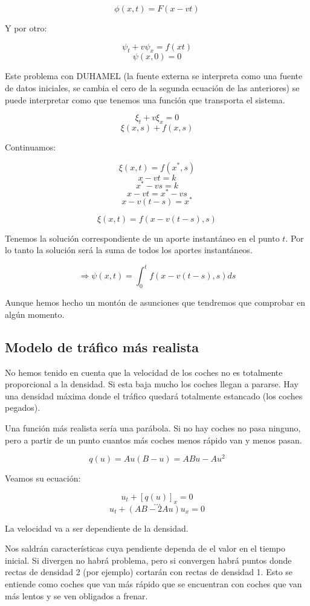 \documentclass[palatino]{apuntes}
\begin{document}
$$\phi(x,t) = F(x-vt)$$

Y por otro:

$$\psi_t + v\psi_x = f(xt)$$
$$\psi(x,0) = 0$$

Este problema con DUHAMEL (la fuente externa se interpreta como una fuente de datos iniciales, se cambia el cero de la segunda ecuación de las anteriores) se puede interpretar como que tenemos una función que transporta el sistema.

$$\xi_t + v\xi_x = 0$$
$$\xi(x,s) + f(x,s)$$

Continuamos:

$$\xi(x,t) = f(x^*,s)$$
$$x-vt = k$$
$$x^* - vs = k$$
$$x-vt = x^* - vs$$
$$x-v(t-s) = x^{*}$$

$$\xi(x,t) = f(x - v(t-s), s)$$


Tenemos la solución correspondiente de un aporte instantáneo en el punto $t$. Por lo tanto la solución será la suma de todos los aportes instantáneos.

$$\Rightarrow \psi(x,t) = \int^{t}_{0} f(x-v(t-s),s) ds $$

Aunque hemos hecho un montón de asunciones que tendremos que comprobar en algún momento.

\subsection{Modelo de tráfico más realista}

No hemos tenido en cuenta que la velocidad de los coches no es totalmente proporcional a la densidad. Si esta baja mucho los coches llegan a pararse. Hay una densidad máxima donde el tráfico quedará totalmente estancado (los coches pegados).

Una función más realista sería una parábola. Si no hay coches no pasa ninguno, pero a partir de un punto cuantos más coches menos rápido van y menos pasan.

$$ q(u) = Au (B-u) = ABu - Au^{2} $$

Veamos su ecuación:

$$u_t + [q(u)]_x = 0$$
$$ … $$
$$ u_t + (AB - 2Au) u_x = 0 $$

La velocidad va a ser dependiente de la densidad.

Nos saldrán características cuya pendiente dependa de el valor en el tiempo inicial. Si divergen no habrá problema, pero si convergen habrá puntos donde rectas de densidad 2 (por ejemplo) cortarán con rectas de densidad 1. Esto se entiende como coches que van más rápido que se encuentran con coches que van más lentos y se ven obligados a frenar.
\end{document}
